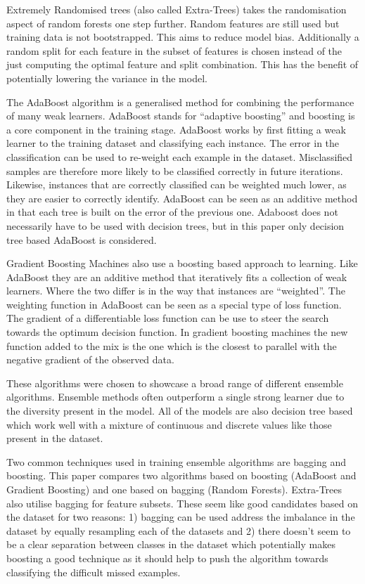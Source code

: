 \documentclass[journal]{IEEEtran}
\begin{document}
Extremely Randomised trees \cite{geurts2006extremely} (also called Extra-Trees) takes the randomisation aspect of random forests one step further. Random features are still used but training data is not bootstrapped. This aims to reduce model bias. Additionally a random split for each feature in the subset of features is chosen instead of the just computing the optimal feature and split combination. This has the benefit of potentially lowering the variance in the model.

The AdaBoost algorithm \cite{freund1997decision} is a generalised method for combining the performance of many weak learners. AdaBoost stands for ``adaptive boosting'' and boosting is a core component in the training stage. AdaBoost works by first fitting a weak learner to the training dataset and classifying each instance. The error in the classification can be used to re-weight each example in the dataset. Misclassified samples are therefore more likely to be classified correctly in future iterations. Likewise, instances that are correctly classified can be weighted much lower, as they are easier to correctly identify. AdaBoost can be seen as an additive method in that each tree is built on the error of the previous one. Adaboost does not necessarily have to be used with decision trees, but in this paper only decision tree based AdaBoost is considered.

Gradient Boosting Machines \cite{natekin2013gradient} also use a boosting based approach to learning. Like AdaBoost they are an additive method that iteratively fits a collection of weak learners. Where the two differ is in the way that instances are ``weighted''. The weighting function in AdaBoost can be seen as a special type of loss function. The gradient of a differentiable loss function can be use to steer the search towards the optimum decision function. In gradient boosting machines the new function added to the mix is the one which is the closest to parallel with the negative gradient of the observed data.

These algorithms were chosen to showcase a broad range of different ensemble algorithms. Ensemble methods often outperform a single strong learner due to the diversity present in the model. All of the models are also decision tree based which work well with a mixture of continuous and discrete values like those present in the dataset. 

Two common techniques used in training ensemble algorithms are bagging and boosting. This paper compares two algorithms based on boosting (AdaBoost and Gradient Boosting) and one based on bagging (Random Forests). Extra-Trees also utilise bagging for feature subsets. These seem like good candidates based on the dataset for two reasons: 1) bagging can be used address the imbalance in the dataset by equally resampling each of the datasets and 2) there doesn't seem to be a clear separation between classes in the dataset which potentially makes boosting a good technique as it should help to push the algorithm towards classifying the difficult missed examples.
\end{document}
